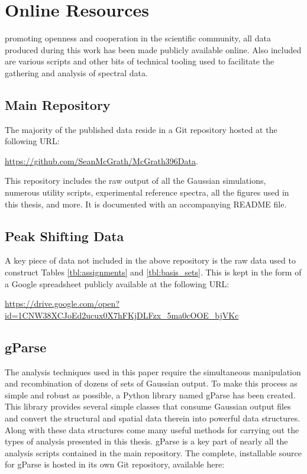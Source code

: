 \chapter{Online Resources}

 promoting openness and cooperation in the scientific community, all data produced during this work has been made publicly available online. Also included are various scripts and other bits of technical tooling used to facilitate the gathering and analysis of spectral data.

\section{Main Repository}

The majority of the published data reside in a Git repository hosted at the following URL:

\bigskip
\noindent\href{https://github.com/SeanMcGrath/McGrath396Data}{https://github.com/SeanMcGrath/McGrath396Data}.

\bigskip
\noindent This repository includes the raw output of all the Gaussian simulations, numerous utility scripts, experimental reference spectra, all the figures used in this thesis, and more. It is documented with an accompanying README file.

\section{Peak Shifting Data}

A key piece of data not included in the above repository is the raw data used to construct Tables \ref{tbl:assignments} and \ref{tbl:basis_sets}. This is kept in the form of a Google spreadsheet publicly available at the following URL:

\noindent\href{https://drive.google.com/open?id=1CNW38XCJoEd2ucux0X7hFKjDLFzx_5ma0cOOE_bjVKc}{https://drive.google.com/open?id=1CNW38XCJoEd2ucux0X7hFKjDLFzx\_5ma0cOOE\_bjVKc}

\section{gParse}

The analysis techniques used in this paper require the simultaneous manipulation and recombination of dozens of sets of Gaussian output. To make this process as simple and robust as possible, a Python library named gParse has been created. This library provides several simple classes that consume Gaussian output files and convert the structural and spatial data therein into powerful data structures. Along with these data structures come many useful methods for carrying out the types of analysis presented in this thesis. gParse is a key part of nearly all the analysis scripts contained in the main repository. The complete, installable source for gParse is hosted in its own Git repository, available here:

